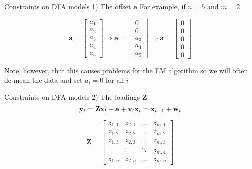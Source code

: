 \documentclass[
  ignorenonframetext,
]{beamer}
\begin{document}
\begin{frame}{Constraints on DFA models \textbar{} 1) The offset
\(\mathbf{a}\)}
\protect\hypertarget{constraints-on-dfa-models-1-the-offset-mathbfa-3}{}
For example, if \(n = 5\) and \(m = 2\)

\[
\mathbf{a} =
\begin{bmatrix}
 a_1 \\
 a_2 \\
 a_3 \\
 a_4 \\
 a_5
\end{bmatrix}
\Rightarrow
\mathbf{a} =
\begin{bmatrix}
 0 \\
 0 \\
 a_3 \\
 a_4 \\
 a_5
\end{bmatrix}
\Rightarrow
\mathbf{a} =
\begin{bmatrix}
 0 \\
 0 \\
 0 \\
 0 \\
 0
\end{bmatrix}
\]

Note, however, that this causes problems for the EM algorithm so we will
often de-mean the data and set \(a_i = 0\) for all \(i\)
\end{frame}

\begin{frame}{Constraints on DFA models \textbar{} 2) The loadings
\(\mathbf{Z}\)}
\protect\hypertarget{constraints-on-dfa-models-2-the-loadings-mathbfz}{}
\[
\mathbf{y}_t = \mathbf{Z} \mathbf{x}_t + \mathbf{a} + \mathbf{v}_t \\
\mathbf{x}_t = \mathbf{x}_{t-1} + \mathbf{w}_t
\]

\[
\mathbf{Z} =
\begin{bmatrix}
 z_{1,1} & z_{2,1} & \dots & z_{m,1} \\
 z_{1,2} & z_{2,2} & \dots & z_{m,2} \\
 z_{1,3} & z_{2,3} & \dots & z_{m,3} \\
 \vdots & \vdots & \ddots & z_{m,4} \\
 z_{1,n} & z_{2,n} & \dots & z_{m,n}
\end{bmatrix}
\]
\end{frame}
\end{document}
